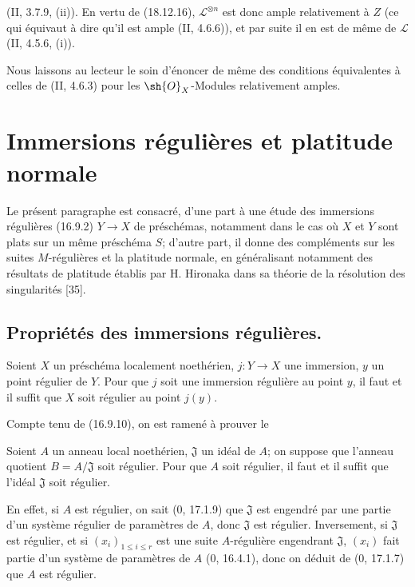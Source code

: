 
(II, 3.7.9, (ii)). En vertu de (18.12.16), $\mathscr L^{\otimes n}$ est donc ample relativement à $Z$ (ce qui équivaut à dire qu'il est ample (II, 4.6.6)), et par suite il en est de même de $\mathscr L$ (II, 4.5.6, (i)).

Nous laissons au lecteur le soin d'énoncer de même des conditions équivalentes à celles de (II, 4.6.3) pour les $\sh{O}_X$-Modules relativement amples.

\section{Immersions régulières et platitude normale}
\label{section:IV.19}

Le présent paragraphe est consacré, d'une part à une étude des immersions régulières (16.9.2) $Y\to X$ de préschémas, notamment dans le cas où $X$ et $Y$ sont plats sur un même préschéma $S$; d'autre part, il donne des compléments sur les suites $M$-régulières et la platitude normale, en généralisant notamment des résultats de platitude établis par H. Hironaka dans sa théorie de la résolution des singularités [35].

\subsection{Propriétés des immersions régulières.}

\begin{proposition}[19.1.1]
\label{IV.19.1.1}
Soient $X$ un préschéma localement noethérien, $j:Y\to X$ une immersion, $y$ un point régulier de $Y$. Pour que $j$ soit une immersion régulière au point $y$, il faut et il suffit que $X$ soit régulier au point $j(y)$.
\end{proposition}

Compte tenu de (16.9.10), on est ramené à prouver le

\begin{corollary}[19.1.2]
Soient $A$ un anneau local noethérien, $\mathfrak J$ un idéal de $A$; on suppose que l'anneau quotient $B=A/\mathfrak J$ soit régulier. Pour que $A$ soit régulier, il faut et il suffit que l'idéal $\mathfrak J$ soit régulier.
\end{corollary}

En effet, si $A$ est régulier, on sait ($0$, 17.1.9) que $\mathfrak J$ est engendré par une partie d'un système régulier de paramètres de $A$, donc $\mathfrak J$ est régulier. Inversement, si $\mathfrak J$ est régulier, et si $(x_i)_{1\leq i\leq r}$ est une suite $A$-régulière engendrant $\mathfrak J$, $(x_i)$ fait partie d'un système de paramètres de $A$ ($0$, 16.4.1), donc on déduit de ($0$, 17.1.7) que $A$ est régulier.

